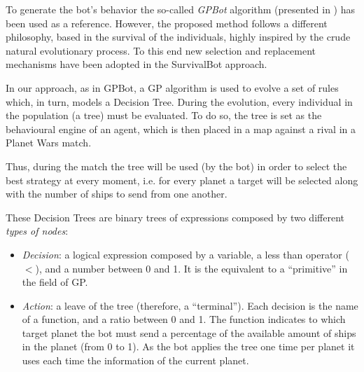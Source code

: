 \documentclass[conference]{IEEEtran}
\begin{document}
To generate the bot's behavior the so-called {\em GPBot} algorithm (presented in \cite{GarciaGP14}) has been used as a reference. However, the proposed method follows a different philosophy, based in the survival of the individuals, highly inspired by the crude natural evolutionary process. To this end new selection and replacement mechanisms have been adopted in the SurvivalBot approach.

In our approach, as in GPBot, a GP algorithm is used to evolve a set of rules which, in turn, models a Decision Tree.
During the evolution, every individual in the population (a tree) must be evaluated. To do so, the tree is set as the behavioural engine of an agent, which is then placed in a map against a rival in a Planet Wars match. %

Thus, during the match the tree will be used (by the bot) in order to select the best strategy at every moment, i.e. for every planet a target will be selected along with the number of ships to send from one another.

These Decision Trees are binary trees of expressions composed by
two different \textit{types of nodes}:

\begin{itemize}
\item {\em Decision}: a logical expression composed by a variable, a less than operator ($<$), and a number between 0 and 1. It is the equivalent to a ``primitive'' in the field of GP.
\item {\em Action}: a leave of the tree (therefore, a ``terminal''). Each decision is the name of a function, and a ratio between 0 and 1. The function indicates to which target planet the bot must send a percentage of the available amount of ships in the planet (from 0 to 1). As the bot applies the tree one time per planet it uses each time the information of the current planet.

\end{itemize}
\end{document}
